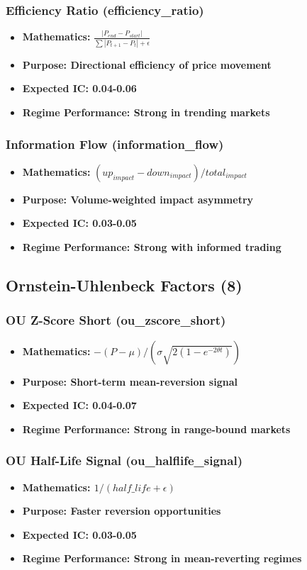 \documentclass[11pt,letterpaper,openany]{book}
\begin{document}
\subsubsection{Efficiency Ratio (efficiency\_ratio)}
\begin{itemize}
    \item \textbf{Mathematics:} $\frac{|P_{end} - P_{start}|}{\sum |P_{t+1} - P_t| + \epsilon}$
    \item \textbf{Purpose: Directional efficiency of price movement}
    \item \textbf{Expected IC: 0.04-0.06}
    \item \textbf{Regime Performance: Strong in trending markets}
\end{itemize}

\subsubsection{Information Flow (information\_flow)}
\begin{itemize}
    \item \textbf{Mathematics:} $(up_{impact} - down_{impact}) / total_{impact}$
    \item \textbf{Purpose: Volume-weighted impact asymmetry}
    \item \textbf{Expected IC: 0.03-0.05}
    \item \textbf{Regime Performance: Strong with informed trading}
\end{itemize}

\subsection{Ornstein-Uhlenbeck Factors (8)}

\subsubsection{OU Z-Score Short (ou\_zscore\_short)}
\begin{itemize}
    \item \textbf{Mathematics:} $-(P - \mu) / (\sigma \sqrt{2(1-e^{-2\theta t})})$
    \item \textbf{Purpose: Short-term mean-reversion signal}
    \item \textbf{Expected IC: 0.04-0.07}
    \item \textbf{Regime Performance: Strong in range-bound markets}
\end{itemize}

\subsubsection{OU Half-Life Signal (ou\_halflife\_signal)}
\begin{itemize}
    \item \textbf{Mathematics: $1 / (half\_life + \epsilon)$}
    \item \textbf{Purpose: Faster reversion opportunities}
    \item \textbf{Expected IC: 0.03-0.05}
    \item \textbf{Regime Performance: Strong in mean-reverting regimes}
\end{itemize}
\end{document}
